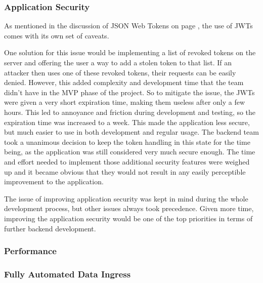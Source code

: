 \subsubsection{Application Security}
As mentioned in the discussion of JSON Web Tokens on page \pageref{jwt}, the use
of JWTs comes with its own set of caveats.

One solution for this issue would be implementing a list of revoked tokens on
the server and offering the user a way to add a stolen token to that list. If an
attacker then uses one of these revoked tokens, their requests can be easily
denied. However, this added complexity and development time that the team didn't
have in the MVP phase of the project. So to mitigate the issue, the JWTs were
given a very short expiration time, making them useless after only a few hours.
This led to annoyance and friction during development and testing, so the
expiration time was increased to a week. This made the application less secure,
but much easier to use in both development and regular usage. The backend team
took a unanimous decision to keep the token handling in this state for the time
being, as the application was still considered very much secure enough. The time
and effort needed to implement those additional security features were weighed
up and it became obvious that they would not result in any easily perceptible
improvement to the application.

The issue of improving application security was kept in mind during the whole
development process, but other issues always took precedence. Given more time,
improving the application security would be one of the top priorities in terms
of further backend development.

\subsubsection{Performance}

\subsubsection{Fully Automated Data Ingress}

